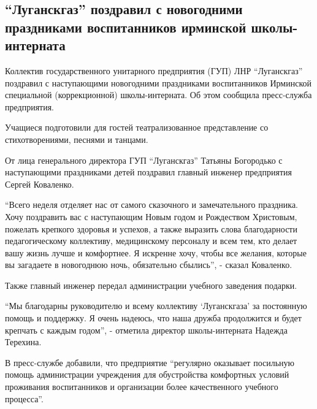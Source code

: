  
 
 
 
 
\subsection{\enquote{Луганскгаз} поздравил с новогодними праздниками воспитанников ирминской школы-интерната}
\label{sec:23_12_2021.stz.news.lnr.lug_info.2.irmin_shkola_internat_lugansk_gaz}


Коллектив государственного унитарного предприятия (ГУП) ЛНР \enquote{Луганскгаз}
поздравил с наступающими новогодними праздниками воспитанников Ирминской
специальной (коррекционной) школы-интерната. Об этом сообщила пресс-служба
предприятия.


Учащиеся подготовили для гостей театрализованное представление со
стихотворениями, песнями и танцами.

От лица генерального директора ГУП \enquote{Луганскгаз} Татьяны Богородько с
наступающими праздниками детей поздравил главный инженер предприятия Сергей
Коваленко.


\enquote{Всего неделя отделяет нас от самого сказочного и замечательного праздника.
Хочу поздравить вас с наступающим Новым годом и Рождеством Христовым, пожелать
крепкого здоровья и успехов, а также выразить слова благодарности
педагогическому коллективу, медицинскому персоналу и всем тем, кто делает вашу
жизнь лучше и комфортнее. Я искренне хочу, чтобы все желания, которые вы
загадаете в новогоднюю ночь, обязательно сбылись}, - сказал Коваленко.


Также главный инженер передал администрации учебного заведения подарки.

\enquote{Мы благодарны руководителю и всему коллективу \enquote{Луганскгаза} за постоянную
помощь и поддержку. Я очень надеюсь, что наша дружба продолжится и будет
крепчать с каждым годом}, - отметила директор школы-интерната Надежда Терехина.

В пресс-службе добавили, что предприятие \enquote{регулярно оказывает посильную помощь
администрации учреждения для обустройства комфортных условий проживания
воспитанников и организации более качественного учебного процесса}.
